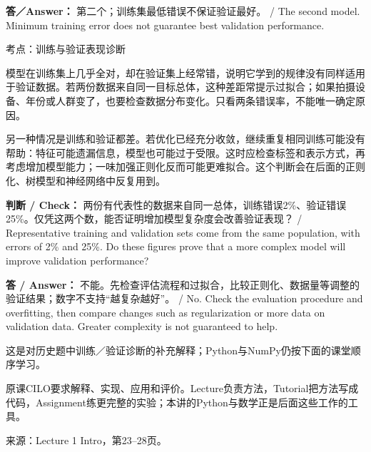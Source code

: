 \textbf{答／Answer：} 第二个；训练集最低错误不保证验证最好。 / The second model. Minimum training error does not guarantee best validation performance.








考点：训练与验证表现诊断
  

模型在训练集上几乎全对，却在验证集上经常错，说明它学到的规律没有同样适用于验证数据。若两份数据来自同一目标总体，这种差距常提示过拟合；如果拍摄设备、年份或人群变了，也要检查数据分布变化。只看两条错误率，不能唯一确定原因。


另一种情况是训练和验证都差。若优化已经充分收敛，继续重复相同训练可能没有帮助：特征可能遗漏信息，模型也可能过于受限。这时应检查标签和表示方式，再考虑增加模型能力；一味加强正则化反而可能更难拟合。这个判断会在后面的正则化、树模型和神经网络中反复用到。


\textbf{判断 / Check：} 两份有代表性的数据来自同一总体，训练错误2\%、验证错误25\%。仅凭这两个数，能否证明增加模型复杂度会改善验证表现？ / Representative training and validation sets come from the same population, with errors of 2\% and 25\%. Do these figures prove that a more complex model will improve validation performance?


\textbf{答 / Answer：} 不能。先检查评估流程和过拟合，比较正则化、数据量等调整的验证结果；数字不支持“越复杂越好”。 / No. Check the evaluation procedure and overfitting, then compare changes such as regularization or more data on validation data. Greater complexity is not guaranteed to help.


这是对历史题中训练／验证诊断的补充解释；Python与NumPy仍按下面的课堂顺序学习。


原课CILO要求解释、实现、应用和评价。Lecture负责方法，Tutorial把方法写成代码，Assignment练更完整的实验；本讲的Python与数学正是后面这些工作的工具。


来源：Lecture 1 Intro，第23–28页。








